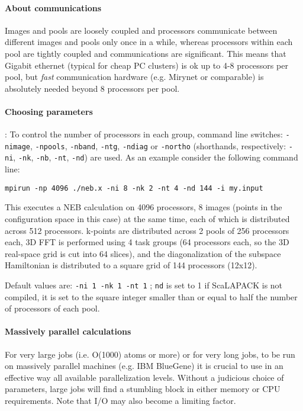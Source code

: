 \documentclass[12pt,a4paper]{article}
\begin{document}
\paragraph{About communications}
Images and pools are loosely coupled and processors communicate
between different images and pools only once in a while, whereas
processors within each pool are tightly coupled and communications
are significant. This means that Gigabit ethernet (typical for
cheap PC clusters) is ok up to 4-8 processors per pool, but {\em fast}
communication hardware (e.g. Mirynet or comparable) is absolutely
needed beyond 8 processors per pool.

\paragraph{Choosing parameters}:
To control the number of processors in each group,
command line switches:
\texttt{-nimage}, \texttt{-npools}, \texttt{-nband},
\texttt{-ntg}, \texttt{-ndiag} or \texttt{-northo}
(shorthands, respectively: \texttt{-ni}, \texttt{-nk}, \texttt{-nb},
\texttt{-nt}, \texttt{-nd})
are used.
As an example consider the following command line:
\begin{verbatim}
mpirun -np 4096 ./neb.x -ni 8 -nk 2 -nt 4 -nd 144 -i my.input
\end{verbatim}
This executes a NEB calculation on 4096 processors, 8 images (points in the configuration
space in this case) at the same time, each of
which is distributed across 512 processors.
k-points are distributed across 2 pools of 256 processors each,
3D FFT is performed using 4 task groups (64 processors each, so
the 3D real-space grid is cut into 64 slices), and the diagonalization
of the subspace Hamiltonian is distributed to a square grid of 144
processors (12x12).

Default values are: \texttt{-ni 1 -nk 1 -nt 1} ;
\texttt{nd} is set to 1 if ScaLAPACK is not compiled,
it is set to the square integer smaller than or equal to  half the number
of processors of each pool.

\paragraph{Massively parallel calculations}
For very large jobs (i.e. O(1000) atoms or more) or for very long jobs,
to be run on massively parallel  machines (e.g. IBM BlueGene) it is
crucial to use in an effective way all available parallelization levels.
Without a judicious choice of parameters, large jobs will find a
stumbling block in either memory or CPU requirements. Note that I/O
may also become a limiting factor.
\end{document}
